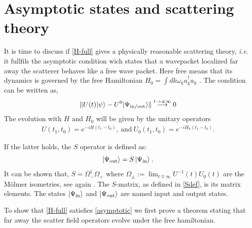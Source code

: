\documentclass[notitlepage, prx, preprint, amsmath,superscriptaddress,amssymb]{revtex4-1}
\begin{document}




\section{Asymptotic states and scattering theory}

It is time to discuss if \eqref{H-full} gives a physically reasonable scattering theory, \emph{i.e.} it fullfils the  asymptotic condition wich states that a wavepacket localized far away the scatterer behaves like a free wave packet.  Here free means that its dynamics is governed by the free Hamiltonian $H_0 = \int dk \omega_k a_k^\dagger a_k$ \cite{Taylor1972}.  The condition can be written as,
\begin{equation}
\label{asymptotic}
\Vert U(t) | \psi \rangle - U^0 |\Psi_{\rm in /out} \rangle \Vert \stackrel{t\to \pm \infty}{\longrightarrow} 0
\end{equation}
The evolution with $H$ and $H_0$ will be given by the unitary operators
\begin{align}
U(t_1,t_0) = e^{-iH(t_1-t_0)},~\mbox{and}~ U_0(t_1,t_0)= e^{-iH_0(t_1-t_0)}.
\end{align}

If the latter holds, the $S$ operator  is defined as:
\begin{equation}
\label{Sinout}
\vert \Psi_{\rm out} \rangle = S \,  \vert \Psi_{\rm in} \rangle  \;.
\end{equation}
It can be shown that, $S = \Omega_-^\dagger \Omega_+$ where $\Omega_\pm := \lim_{t \mp \infty} U^{-1} (t) U_0 (t)$ are the M\"  olmer isometries, see again \cite{Taylor1972}. The $S$-matrix, as defined in  \eqref{Sdef}, is its matrix elements.  The  states $| \Psi_{\rm in} \rangle$ and $|\Psi_{\rm out} \rangle$ are  named input and output states.
 

To show that \eqref{H-full} satisfies \eqref{asymptotic} we first prove a theorem stating that far away the scatter field operators evolve under the free hamiltonian.
\end{document}
